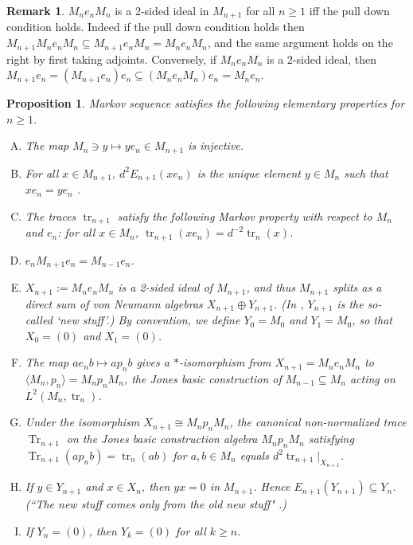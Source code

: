 \documentclass[11pt]{article}
\theoremstyle{plain}
\newtheorem{prop}[thm]{Proposition}
\theoremstyle{definition}
\newtheorem{rem}[thm]{Remark}
\DeclareMathOperator{\Tr}{Tr}
\DeclareMathOperator{\tr}{tr}
\begin{document}
\begin{rem}
$M_n e_n M_n$ is a 2-sided ideal in $M_{n+1}$ for all $n\geq 1$ iff the pull down condition holds. Indeed if the pull down condition holds then $M_{n+1} M_n e_n M_n \subseteq M_{n+1} e_n M_n = M_n e_n M_n$, and the same argument holds on the right by first taking adjoints. Conversely, if $M_n e_n M_n$ is a 2-sided ideal, then $M_{n+1} e_n = (M_{n+1} e_n)e_n \subseteq (M_n e_n M_n) e_n = M_n e_n$.
\end{rem}




\begin{prop} Markov sequence satisfies the following elementary properties for $n\geq 1$.
\begin{enumerate}[(A)]
\item
\label{EP:injective}
The map $M_{n}\ni y\mapsto ye_n \in M_{n+1}$ is injective.

\item
\label{EP:UniquePullDown}
For all $x\in M_{n+1}$, $d^{2}E_{n+1}(x e_n)$ is the unique element $y\in M_n$ such that $x e_n = ye_n$ \cite[Lem.~1.2]{MR860811}.

\item
\label{EP:MarkovTraces}
The traces $\tr_{n+1}$ satisfy the following \emph{Markov property} with respect to $M_n$ and $e_n$: for all $x\in M_n$, $\tr_{n+1}(xe_n) = d^{-2} \tr_n(x)$.

\item
\label{EP:CompressM_{n+1}}
$e_n M_{n+1}e_n = M_{n-1}e_n$.

\item
\label{EP:2SidedIdeal}
$X_{n+1}:=M_n e_n M_n$ is a 2-sided ideal of $M_{n+1}$, and thus $M_{n+1}$ splits as a direct sum of von Neumann algebras $X_{n+1}\oplus Y_{n+1}$.
(In \cite[Thm.~4.1.4 and Thm.~4.6.3]{MR999799}, $Y_{n+1}$ is the so-called `new stuff'.)
By convention, we define $Y_0 = M_0$ and $Y_1 = M_0$, so that $X_0 = (0)$ and $X_1 = (0)$.

\item
\label{EP:BasicContruction}
The map $ae_n b\mapsto ap_n b$ gives a $*$-isomorphism from $X_{n+1}=M_n e_n M_n$ to $\langle M_n , p_n\rangle=M_np_nM_n$, the Jones basic construction of $M_{n-1} \subseteq M_n$ acting on $L^2(M_n,\tr_n)$.

\item
\label{EP:OtherMarkovDef}
Under the isomorphism $X_{n+1} \cong M_n p_n M_n$, the canonical non-normalized trace $\Tr_{n+1}$ on the Jones basic construction algebra $M_np_nM_n$ satisfying $\Tr_{n+1}(ap_nb) = \tr_n(ab)$ for $a,b\in M_n$ equals $d^2 \tr_{n+1}|_{X_{n+1}}$.

\item
\label{EP:NewStuff}
If $y\in Y_{n+1}$ and $x\in X_{n}$, then $yx = 0$ in $M_{n+1}$.
Hence $E_{n+1}(Y_{n+1}) \subseteq Y_{n}$.
(``The new stuff comes only from the old new stuff" \cite{MR999799}.)

\item
\label{EP:FiniteDepth}
If $Y_n =(0)$, then $Y_{k} = (0)$ for all $k\geq n$.

\end{enumerate}
\end{prop}
\end{document}
